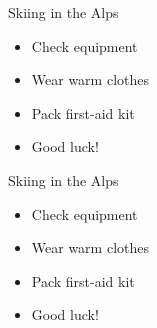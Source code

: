 \documentclass[12pt]{beamer}
\begin{document}
{ %
{}

\begin{frame}[t]{Skiing in the Alps}

\begin{itemize}
  \item Check equipment
  \item Wear warm clothes
  \item Pack first-aid kit
  \item Good luck!
\end{itemize}

\end{frame}

} %

\begin{frame}[t]{Skiing in the Alps}

\begin{itemize}
  \item Check equipment
  \item Wear warm clothes
  \item Pack first-aid kit
  \item Good luck!
\end{itemize}

\end{frame}
\end{document}
